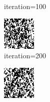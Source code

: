\documentclass{article}
\begin{document}
\begin{figure}[h]
\begin{subfigure}[t]{0.18\textwidth}
\vspace{-0.6cm}
\caption{iteration=100}
\end{subfigure}\hspace{0.01\textwidth}
\begin{subfigure}[t]{0.18\textwidth}
\centering
\includegraphics[width=\textwidth]{./computational/results/gibbs_comb_sampler_negative_iter_200.png}
\vspace{-0.6cm}
\caption{iteration=200}
\end{subfigure}\hspace{0.01\textwidth}
\begin{subfigure}[t]{0.18\textwidth}
\centering
\includegraphics[width=\textwidth]{./computational/results/gibbs_comb_sampler_negative_iter_300.png}

\end{subfigure}
\end{figure}
\end{document}
